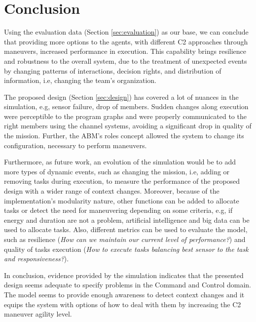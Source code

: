 \section{Conclusion}
\label{sec:conclusion}

Using the evaluation data (Section \ref{sec:evaluation}) as our base, we can conclude that providing more options to the agents, with different C2 approaches through maneuvers, increased performance in execution. This capability brings resilience and robustness to the overall system, due to the treatment of unexpected events by changing patterns of interactions, decision rights, and distribution of information, i.e, changing the team's organization.

The proposed design (Section \ref{sec:design}) has covered a lot of nuances in the simulation, e.g, sensor failure, drop of members. Sudden changes along execution were perceptible to the program graphs and were properly communicated to the right members using the channel systems, avoiding a significant drop in quality of the mission. Further, the ABM's roles concept allowed the system to change its configuration, necessary to perform maneuvers.

Furthermore, as future work, an evolution of the simulation would be to add more types of dynamic events, such as changing the mission, i.e, adding or removing tasks during execution, to measure the performance of the proposed design with a wider range of context changes. Moreover, because of the implementation's modularity nature, other functions can be added to allocate tasks or detect the need for maneuvering depending on some criteria, e.g, if energy and duration are not a problem, artificial intelligence and big data can be used to allocate tasks. Also, different metrics can be used to evaluate the model, such as resilience (\textit{How can we maintain our current level of performance?}) and quality of tasks execution (\textit{How to execute tasks balancing best sensor to the task and responsiveness?}).

In conclusion, evidence provided by the simulation indicates that the presented design seems adequate to specify problems in the Command and Control domain. The model seems to provide enough awareness to detect context changes and it equips the system with options of how to deal with them by increasing the C2 maneuver agility level.